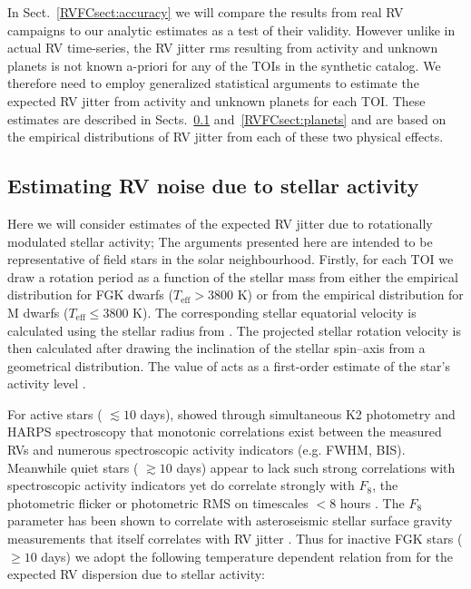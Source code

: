 In Sect.~\ref{RVFCsect:accuracy} we will compare the results from real RV campaigns to our 
analytic estimates as a test of their validity. 
However unlike in actual RV time-series, the RV jitter rms
resulting from activity and unknown planets is not known a-priori for any of the TOIs in the
 synthetic catalog. We therefore need to employ generalized statistical arguments
to estimate the expected RV jitter from activity and unknown planets for each TOI. These estimates are
described in Sects.~\ref{RVFCsect:act} and~\ref{RVFCsect:planets} and are based on the empirical distributions of
RV jitter from each of these two physical effects.

\subsection{Estimating RV noise due to stellar activity} \label{RVFCsect:act}
Here we will consider estimates of the expected RV jitter due to rotationally modulated stellar
activity;  The arguments presented here are intended to be
representative of field stars in the
solar neighbourhood. Firstly, for each TOI we draw a rotation period \prot{} as a function of the stellar
mass from either the \cite{pizzolato03} empirical distribution for FGK dwarfs ($T_{\text{eff}} > 3800$ K) or from
the \cite{newton16a} empirical distribution for M dwarfs ($T_{\text{eff}} \leq 3800$ K). The corresponding
stellar equatorial velocity is calculated using the stellar radius from . The projected
stellar rotation velocity \vsini{} is then calculated after drawing the inclination of the stellar spin--axis
from a geometrical distribution. The value of \vsini{} acts as a first-order estimate of the star's activity
level \citep[e.g.][]{west15, moutou17}.

For active stars
(\prot{} $\lesssim 10$ days), \cite{oshagh17} showed through simultaneous
K2 photometry and HARPS spectroscopy that monotonic correlations exist between the measured RVs and numerous
spectroscopic activity indicators (e.g. \Rhk{,} FWHM, BIS). Meanwhile quiet stars
(\prot{} $\gtrsim 10$ days) appear to lack such strong
correlations with spectroscopic activity indicators yet do correlate strongly with $F_8$, the photometric
flicker or photometric RMS on timescales $<8$ hours \citep{bastien13}. The $F_8$ parameter has been shown to
correlate with asteroseismic stellar surface gravity measurements \citep{bastien13} that itself correlates
with RV jitter \citep{bastien14}. Thus for inactive FGK stars (\prot{} $\geq 10$ days)
we adopt the following temperature dependent
relation from \cite{cegla14} for the expected RV dispersion due to stellar activity:

